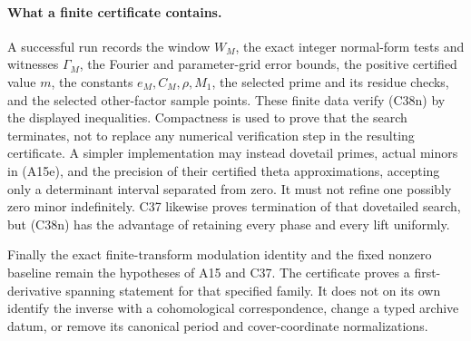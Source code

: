 \paragraph{What a finite certificate contains.}
A successful run records the window $W_M$, the exact integer
normal-form tests and witnesses $\Gamma_M$, the Fourier and
parameter-grid error bounds, the positive certified value $m$,
the constants $e_M,C_M,\rho,M_1$, the selected prime and its
residue checks, and the selected other-factor sample points.
These finite data verify (C38n) by the displayed inequalities.
Compactness is used to prove that the search terminates, not to
replace any numerical verification step in the resulting
certificate.  A simpler implementation may instead dovetail
primes, actual minors in (A15e), and the precision of their
certified theta approximations, accepting only a determinant
interval separated from zero.  It must not refine one possibly
zero minor indefinitely.  C37 likewise proves termination of
that dovetailed search, but (C38n) has the advantage
of retaining every phase and every lift uniformly.

Finally the exact finite-transform modulation identity and the
fixed nonzero baseline remain the hypotheses of A15 and C37.
The certificate proves a first-derivative spanning statement for
that specified family.  It does not on its own identify the
inverse with a cohomological correspondence, change a typed
archive datum, or remove its canonical period and cover-coordinate
normalizations.
